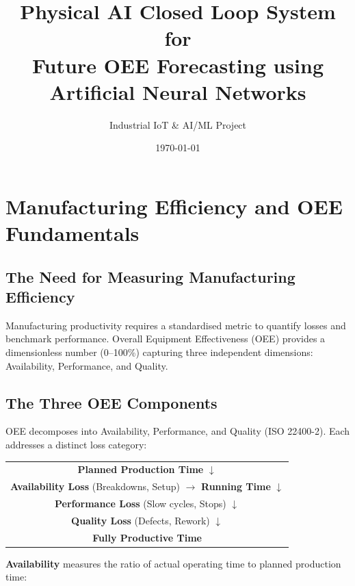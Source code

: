 \documentclass[a4paper,11pt]{article}
\title{\textbf{Physical AI Closed Loop System for\\[4pt]
Future OEE Forecasting using Artificial Neural Networks}}
\author{Industrial IoT \& AI/ML Project}
\date{\today}
\begin{document}
\normalsize
\setlength{\parskip}{0.5ex plus 0.2ex minus 0.1ex}
\maketitle
\thispagestyle{empty}

\section{Manufacturing Efficiency and OEE Fundamentals}

\vspace{-6pt}
\subsection{The Need for Measuring Manufacturing Efficiency}

Manufacturing productivity requires a standardised metric to quantify losses and benchmark performance. Overall Equipment Effectiveness (OEE) provides a dimensionless number (0--100\%) capturing three independent dimensions: Availability, Performance, and Quality.

\subsection{The Three OEE Components}

OEE decomposes into Availability, Performance, and Quality (ISO 22400-2). Each addresses a distinct loss category:

\medskip
\begin{center}
\begin{tabular}{c}
\textbf{Planned Production Time} $\downarrow$ \\
\textbf{Availability Loss} (Breakdowns, Setup) $\rightarrow$ \textbf{Running Time} $\downarrow$ \\
\textbf{Performance Loss} (Slow cycles, Stops) $\downarrow$ \\
\textbf{Quality Loss} (Defects, Rework) $\downarrow$ \\
\textbf{Fully Productive Time}
\end{tabular}
\end{center}
\medskip

\textbf{Availability} measures the ratio of actual operating time to planned production time:
\end{document}
